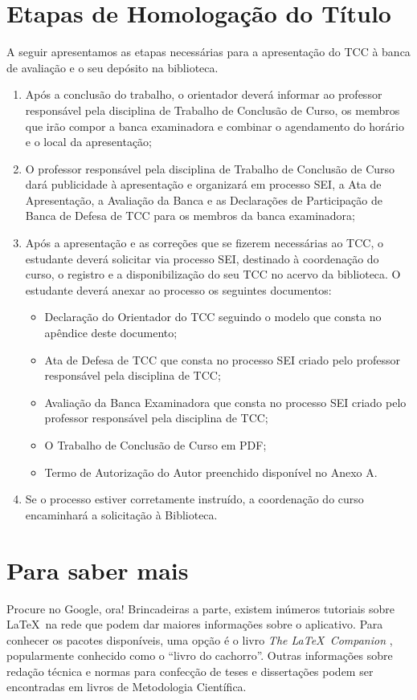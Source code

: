 \section{Etapas de Homologação do Título}

A seguir apresentamos as etapas necessárias para a apresentação do TCC à banca de avaliação e o seu depósito na biblioteca.

\begin{enumerate}
	\item Após a conclusão do trabalho, o orientador deverá informar ao professor responsável pela disciplina de Trabalho de Conclusão de Curso, os membros que irão compor a banca examinadora e combinar o agendamento do horário e o local da apresentação;
	\item O professor responsável pela disciplina de Trabalho de Conclusão de Curso dará publicidade à apresentação e organizará em processo SEI, a Ata de Apresentação, a Avaliação da Banca e as Declarações de Participação de Banca de Defesa de TCC para os membros da banca examinadora;
	\item Após a apresentação e as correções que se fizerem necessárias ao TCC, o estudante deverá solicitar via processo SEI, destinado à coordenação do curso, o registro e a disponibilização do seu TCC no acervo da biblioteca. O estudante deverá anexar ao processo os seguintes documentos:
	\begin{itemize}
		\item Declaração do Orientador do TCC seguindo o modelo que consta no apêndice deste documento;
		\item Ata de Defesa de TCC que consta no processo SEI criado pelo professor responsável pela disciplina de TCC;
		\item Avaliação da Banca Examinadora que consta no processo SEI criado pelo professor responsável pela disciplina de TCC;
		\item O Trabalho de Conclusão de Curso em PDF;
		\item Termo de Autorização do Autor preenchido disponível no Anexo A.
	\end{itemize}
	\item Se o processo estiver corretamente instruído, a coordenação do curso encaminhará a solicitação à Biblioteca.
\end{enumerate}

\section{Para saber mais}

Procure no Google, ora! Brincadeiras a parte, existem inúmeros
tutoriais sobre \LaTeX\ na rede que podem dar maiores informações
sobre o aplicativo. Para conhecer os pacotes disponíveis, uma opção é
o livro \emph{The \LaTeX\ Companion} \cite{LATEX04}, popularmente
conhecido como o ``livro do cachorro''. Outras informações sobre
redação técnica e normas para confecção de teses e dissertações podem
ser encontradas em livros de Metodologia Científica.
